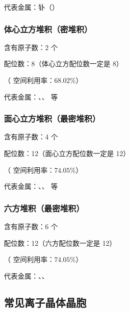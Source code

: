                  代表金属：钋（）

            \subsubsection{体心立方堆积（密堆积）}


                 含有原子数：2 个

                 配位数：8（体心立方配位数一定是 8）

                （ 空间利用率：\(68.02\%\)）

                 代表金属：、、 等

            \subsubsection{面心立方堆积（最密堆积）}


                 含有原子数：4 个

                 配位数：12（面心立方配位数一定是 12）

                （ 空间利用率：\(74.05\%\)）

                 代表金属：、、 等

            \subsubsection{六方堆积（最密堆积）}


                 含有原子数：6 个

                 配位数：12（六方配位数一定是 12）

                （ 空间利用率：\(74.05\%\)）

                 代表金属：、、

        \subsection{常见离子晶体晶胞}\label{subsec:常见离子晶体晶胞}

